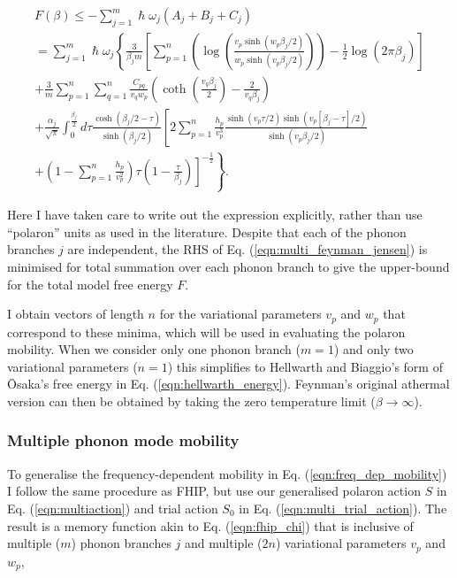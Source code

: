 \begin{equation} \label{eqn:multi_feynman_jensen}
    \begin{gathered}
         F(\beta) \leq -\sum_{j=1}^m \hslash \omega_j \left(A_j + B_j + C_j\right) \\ = \sum_{j=1}^m \hslash \omega_j \left\{ \frac{3}{\beta_j m} \left[ \sum_{p = 1}^n \left( \log\left(\frac{v_{p} \sinh (w_{p} \beta_j / 2)}{w_{p} \sinh (v_{p} \beta_j / 2)}\right) \right) - \frac{1}{2}\log \left(2\pi\beta_j\right) \right] \right. \\ \left. + \frac{3}{m}\sum_{p = 1}^n \sum_{q = 1}^n \frac{C_{pq}}{v_{q} w_{p}} \left( \coth \left(\frac{v_{q}\beta_j}{2}\right) - \frac{2}{v_{q}\beta_j}\right) \right. \\ 
        \left. + \frac{\alpha_j}{\sqrt{\pi}} \int_0^{\frac{\beta_j}{2}} d\tau \frac{\cosh(\beta_j/2 - \tau)}{\sinh(\beta_j/2)} \left[2 \sum_{p=1}^n \frac{h_{p}}{v_{p}^3} \frac{\sinh{(v_{p} \tau/2)\sinh{(v_{p}[\beta_j-\tau]/2)}}}{\sinh(v_{p}\beta_j/2)} \right. \right.\\
        \left. \left. + \left(1 - \sum_{p = 1}^n \frac{h_{p}}{v_{p}^2}\right) \tau \left(1 - \frac{\tau}{\beta_j}\right) \right]^{-\frac{1}{2}} \right\} .
    \end{gathered}
\end{equation}

Here I have taken care to write out the expression explicitly, rather than use ``polaron'' units as used in the literature. Despite that each of the phonon branches $j$ are independent, the RHS of Eq. (\ref{eqn:multi_feynman_jensen}) is minimised for total summation over each phonon branch to give the upper-bound for the total model free energy $F$. 

I obtain vectors of length $n$ for the variational parameters $v_{p}$ and $w_{p}$ that correspond to these minima, which will be used in evaluating the polaron mobility. When we consider only one phonon branch ($m = 1$) and only two variational parameters ($n = 1$) this simplifies to Hellwarth and Biaggio's form of \=Osaka's free energy in Eq. (\ref{eqn:hellwarth_energy}). Feynman's original athermal version can then be obtained by taking the zero temperature limit ($\beta \rightarrow \infty$).

\subsubsection{Multiple phonon mode mobility}

To generalise the frequency-dependent mobility in Eq. (\ref{eqn:freq_dep_mobility}) I follow the same procedure as FHIP, but use our generalised polaron action $S$ in Eq. (\ref{eqn:multiaction}) and trial action $S_0$ in Eq. (\ref{eqn:multi_trial_action}). The result is a memory function akin to Eq. (\ref{eqn:fhip_chi}) that is inclusive of multiple ($m$) phonon branches $j$ and multiple ($2n$) variational parameters $v_{p}$ and $w_{p}$,

